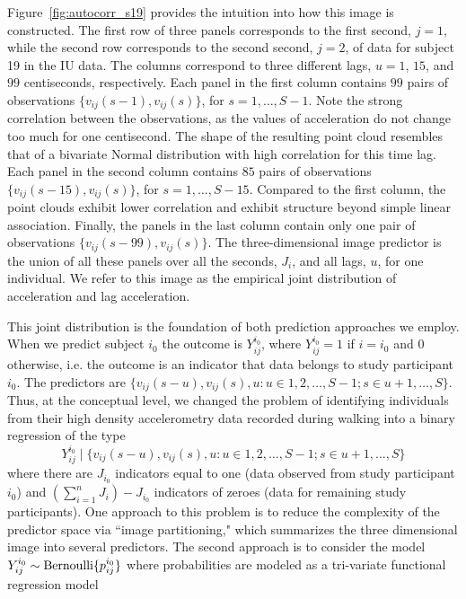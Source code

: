 Figure~\ref{fig:autocorr_s19} provides the intuition into how this image is constructed. The first row of three panels corresponds to the first second, $j=1$, while the second row corresponds to the second second, $j=2$, of data for subject 19 in the IU data. The columns correspond to three different lags, $u=1$, $15$, and $99$ centiseconds, respectively. Each panel in the first column contains $99$ pairs of observations $\{v_{ij}(s-1), v_{ij}(s)\}$, for $s=1, \ldots, S-1$. Note the strong correlation between the observations, as the values of acceleration do not change too much for one centisecond. The shape of the resulting point cloud resembles that of a bivariate Normal distribution with high correlation for this time lag.  Each panel in the second column contains $85$ pairs of observations $\{v_{ij}(s-15), v_{ij}(s)\}$, for $s=1, \ldots, S-15$. Compared to the first column, the point clouds exhibit lower correlation and exhibit structure beyond simple linear association. Finally, the panels in the last column contain only one pair of observations $\{v_{ij}(s-99), v_{ij}(s)\}$. The three-dimensional image predictor is the union of all these panels over all the seconds, $J_i$, and all lags, $u$, for one individual. We refer to this image as the empirical joint distribution of acceleration and lag acceleration. 

This joint distribution is the foundation of both prediction approaches we employ. When we predict subject $i_0$ the outcome is $Y_{ij}^{i_0}$, where $Y_{ij}^{i_0}=1$ if $i=i_0$ and $0$ otherwise, i.e. the outcome is an indicator that data belongs to study participant $i_0$. The predictors are $\{v_{ij}(s-u),v_{ij}(s),u:u\in 1,2,\ldots,S-1; s\in u+1,\ldots,S\}$. 
 Thus, at the conceptual level, we changed the problem of identifying individuals from their high density accelerometry data recorded during walking into a binary regression of the type
\begin{equation}
Y_{ij}^{i_0} \; |\; \{v_{ij}(s-u),v_{ij}(s),u:u\in 1,2,\ldots,S-1; s\in u+1,\ldots,S\}
\label{eq:conceptual}
\end{equation}
where there are $J_{i_0}$ indicators equal to one (data observed from study participant $i_0$) and $(\sum_{i=1}^n J_i) - J_{i_0}$ indicators of zeroes (data for remaining study participants). One approach to this problem is to reduce the complexity of the predictor space via ``image partitioning," which  summarizes the three dimensional image into several predictors. The second approach is to consider the model $Y_{ij}^{i_0}\sim {\rm Bernoulli} \{p_{ij}^{i_0}\}$ where probabilities are modeled as a tri-variate functional regression model


